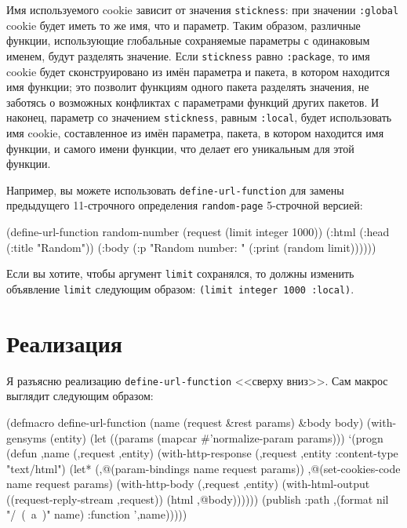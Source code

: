 Имя используемого cookie зависит от значения \lstinline{stickness}: при значении \lstinline{:global}
cookie будет иметь то же имя, что и параметр. Таким образом, различные функции,
использующие глобальные сохраняемые параметры с одинаковым именем, будут разделять
значение. Если \lstinline{stickness} равно \lstinline{:package}, то имя cookie будет сконструировано
из имён параметра и пакета, в котором находится имя функции; это позволит функциям одного
пакета разделять значения, не заботясь о возможных конфликтах с параметрами функций других
пакетов. И наконец, параметр со значением \lstinline{stickness}, равным \lstinline{:local}, будет
использовать имя cookie, составленное из имён параметра, пакета, в котором находится имя
функции, и самого имени функции, что делает его уникальным для этой функции.

Например, вы можете использовать \lstinline{define-url-function} для замены предыдущего
11-строчного определения \lstinline{random-page} 5-строчной версией:

\begin{myverb}
(define-url-function random-number (request (limit integer 1000))
  (:html
    (:head (:title "Random"))
    (:body
      (:p "Random number: " (:print (random limit))))))
\end{myverb}

Если вы хотите, чтобы аргумент \lstinline{limit} сохранялся, то должны изменить объявление
\lstinline{limit} следующим образом: \lstinline{(limit integer 1000 :local)}.

\section{Реализация}

Я разъясню реализацию \lstinline{define-url-function} <<сверху вниз>>. Сам макрос выглядит
следующим образом:

\begin{myverb}
(defmacro define-url-function (name (request &rest params) &body body)
  (with-gensyms (entity)
    (let ((params (mapcar #'normalize-param params)))
      `(progn
         (defun ,name (,request ,entity)
           (with-http-response (,request ,entity :content-type "text/html")
             (let* (,@(param-bindings name request params))
               ,@(set-cookies-code name request params)
               (with-http-body (,request ,entity)
                 (with-html-output ((request-reply-stream ,request))
                   (html ,@body))))))
         (publish :path ,(format nil "/~(~a~)" name) :function ',name)))))
\end{myverb}

